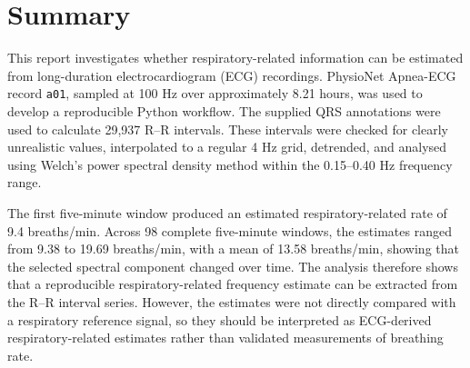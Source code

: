 \chapter*{Summary}

This report investigates whether respiratory-related information can be estimated from long-duration electrocardiogram (ECG) recordings. PhysioNet Apnea-ECG record \texttt{a01}, sampled at 100 Hz over approximately 8.21 hours, was used to develop a reproducible Python workflow. The supplied QRS annotations were used to calculate 29,937 R--R intervals. These intervals were checked for clearly unrealistic values, interpolated to a regular 4 Hz grid, detrended, and analysed using Welch's power spectral density method within the 0.15--0.40 Hz frequency range.

The first five-minute window produced an estimated respiratory-related rate of 9.4 breaths/min. Across 98 complete five-minute windows, the estimates ranged from 9.38 to 19.69 breaths/min, with a mean of 13.58 breaths/min, showing that the selected spectral component changed over time. The analysis therefore shows that a reproducible respiratory-related frequency estimate can be extracted from the R--R interval series. However, the estimates were not directly compared with a respiratory reference signal, so they should be interpreted as ECG-derived respiratory-related estimates rather than validated measurements of breathing rate.

